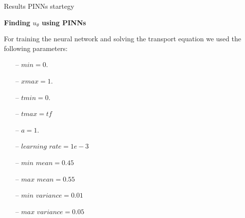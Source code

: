 \begin{frame}{Results PINNs startegy}

    \textbf{{Finding $u_\theta$ using PINNs}}
    
    For training the neural network and solving the transport equation we used the following parameters:

    \begin{itemize}
        \item[--] $min = 0.$
        \item[--] $xmax = 1.$
        \item[--] $tmin = 0.$
        \item[--] $tmax = tf$
        \item[--] $a = 1.$
        \item[--] $learning$ $rate = 1e-3$
        \item[--] $min$ $mean = 0.45$
        \item[--] $max$ $mean = 0.55$
        \item[--] $min$ $variance = 0.01$
        \item[--] $max$ $variance = 0.05$
    \end{itemize}

   
\end{frame}
